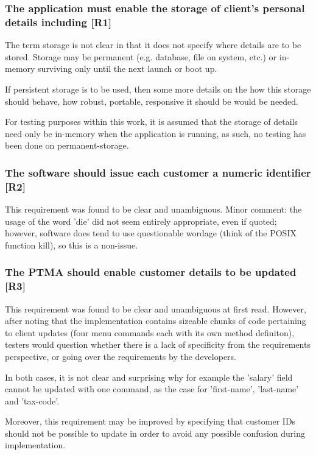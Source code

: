 \subsubsection{The application must enable the storage of client’s personal details including [R1]}
The term storage is not clear in that it does not specify where details are to be stored. 
Storage may be permanent (e.g. database, file on system, etc.) or in-memory surviving only until the next launch or boot up. 
\par
If persistent storage is to be used, then some more details on the how this storage should behave, how robust, portable, responsive it should be would be needed. 
\par
For testing purposes within this work, it is assumed that the storage of details need only be in-memory when the application is running, as such, no testing has been done on permanent-storage.

\subsubsection{The software should issue each customer a numeric identifier [R2]}
This requirement was found to be clear and unambiguous. 
Minor comment: the usage of the word 'die' did not seem entirely appropriate, even if quoted; however, software does tend to use questionable wordage (think of the POSIX function kill), so this is a non-issue.  

\subsubsection{The PTMA should enable customer details to be updated [R3]}
This requirement was found to be clear and unambiguous at first read. 
However, after noting that the implementation contains sizeable chunks of code pertaining to client updates (four menu commands each with its own method definiton), testers would question whether there is a lack of specificity from the requirements perspective, or going over the requirements by the developers. 
\par
In both cases, it is not clear and surprising why for example the 'salary' field cannot be updated with one command, as the case for 'first-name', 'last-name' and 'tax-code'.  
\par
Moreover, this requirement may be improved by specifying that customer IDs should not be possible to update in order to avoid any possible confusion during implementation. 

